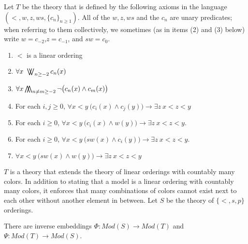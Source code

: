 \documentclass[11pt]{amsart}
\theoremstyle{definition}
\newcommand{\bigwwedge}{%
  \mathop{
    \mathchoice{\bigwedge\mkern-15mu\bigwedge}
               {\bigwedge\mkern-12.5mu\bigwedge}
               {\bigwedge\mkern-12.5mu\bigwedge}
               {\bigwedge\mkern-11mu\bigwedge}
    }
}
\newcommand{\bigvvee}{%
  \mathop{
    \mathchoice{\bigvee\mkern-15mu\bigvee}
               {\bigvee\mkern-12.5mu\bigvee}
               {\bigvee\mkern-12.5mu\bigvee}
               {\bigvee\mkern-11mu\bigvee}
    }
}
\begin{document}
\begin{definition}
Let $T$ be the theory that is defined by the following axioms in the language $(<,w,z,ws,\{c_n\}_{n\geq 1})$. All of the $w,z,ws$ and the $c_n$ are unary predicates; when referring to them collectively, we sometimes (as in items (2) and (3) below) write $w=c_{-2}$,$z=c_{-1}$, and $sw=c_{0}$.
\begin{enumerate}
	\item $<$ is a linear ordering
	\item $\forall x ~ \bigvvee_{n\geq -2} c_n(x)$
	\item $\forall x \bigwwedge_{n\neq m\geq -2} \lnot\big(c_n(x) \land c_m(x)\big)$
	\item For each $i,j\geq 0$, $\forall x<y ~ \big(c_i(x) \land c_j(y)\big)\to \exists z ~ x<z<y$
	\item For each $i\geq 0$, $\forall x<y ~ \big(c_i(x) \land w(y)\big)\to \exists z ~ x<z<y$.
	\item For each $i\geq 0$, $\forall x<y ~ \big(sw(x) \land c_i(y)\big)\to \exists z ~ x<z<y$.
    \item $\forall x<y ~ \big(sw(x) \land w(y)\big)\to \exists z ~ x<z<y$
\end{enumerate}
\end{definition}

$T$ is a theory that extends the theory of linear orderings with countably many colors.
In addition to stating that a model is a linear ordering with countably many colors, it enforces that many combinations of colors cannot exist next to each other without another element in between.
Let $S$ be the theory of $\{<,s,p\}$ orderings.
\begin{proposition}\label{prop:coloriffSp}
There are inverse embeddings $\Phi:Mod(S)\to Mod(T)$ and $\Psi:Mod(T)\to Mod(S)$.
\end{proposition}
\end{document}
